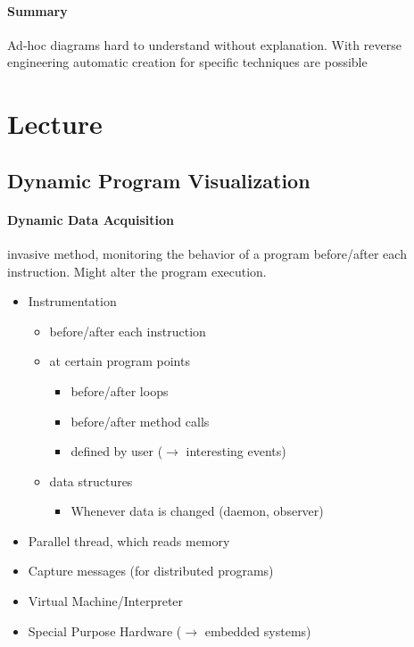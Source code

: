 \documentclass[10pt,a4paper]{article}
\begin{document}
	\paragraph{Summary}
	Ad-hoc diagrams hard to understand without explanation. With reverse engineering automatic creation for specific techniques are possible 
	
\section{Lecture}
	\subsection{Dynamic Program Visualization}
		
		\paragraph{Dynamic Data Acquisition} invasive method, monitoring the behavior of a program before/after each instruction. Might alter the program execution.
		\begin{itemize}
			\item Instrumentation
			\begin{itemize}
				\item before/after each instruction
				\item at certain program points
				\begin{itemize}
					\item before/after loops
					\item before/after method calls
					\item defined by user ($\rightarrow$ interesting events)
				\end{itemize}
				\item data structures
				\begin{itemize}
					\item Whenever data is changed (daemon, observer)
				\end{itemize}
			\end{itemize}
			\item Parallel thread, which reads memory
			\item Capture messages (for distributed programs)
			\item Virtual Machine/Interpreter
			\item Special Purpose Hardware ($\rightarrow$ embedded systems)
		\end{itemize}
	
\end{document}
